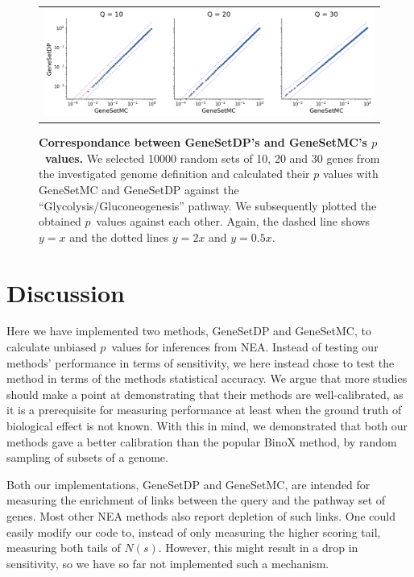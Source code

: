 \documentclass[a4paper,american]{lipics-v2016}
\begin{document}
\begin{figure}[htb]
  \begin{center}
		  \begin{tabular}[t]{c}
				\includegraphics[width=1.0\textwidth]{figures/scatter_dp_mc.png}
		\end{tabular}
  \end{center}
  \caption{{\bf Correspondance between GeneSetDP's and GeneSetMC's $p$~values.} We selected 10000 random sets of 10, 20 and 30 genes from the investigated genome definition and calculated their $p$ values with GeneSetMC and GeneSetDP against the ``Glycolysis/Gluconeogenesis'' pathway. We subsequently plotted the obtained $p$~values against each other. Again, the dashed line shows $y = x$ and the dotted lines $y = 2x$ and $y = 0.5x$.}
  \label{fig:pscatter}
\end{figure}

\section*{Discussion}

Here we have implemented two methods, GeneSetDP and GeneSetMC, to calculate unbiased $p$~values for inferences from NEA.
Instead of testing our methods' performance in terms of sensitivity, we here instead chose to test the method in terms of the methods statistical accuracy. We argue that more studies should make a point at demonstrating that their methods are well-calibrated, as it is a prerequisite for measuring performance at least when the ground truth of biological effect is not known.
With this in mind, we demonstrated that both our methods gave a better calibration than the popular BinoX method, by random sampling of subsets of a genome.

Both our implementations, GeneSetDP and GeneSetMC, are intended for measuring the enrichment of links between the query and the pathway set of genes. Most other NEA methods also report depletion of such links. One could easily modify our code to, instead of only measuring the higher scoring tail, measuring both tails of $N(s)$. However, this might result in a drop in sensitivity, so we have so far not implemented such a mechanism.
\end{document}
